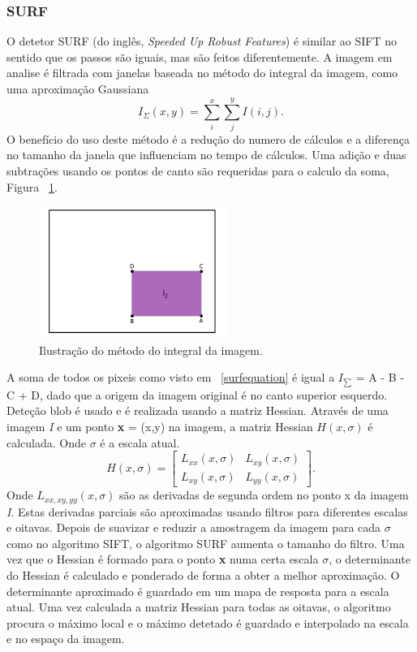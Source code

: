\subsubsection{SURF}

O detetor SURF (do inglês, \textit{Speeded Up Robust Features}) é similar ao SIFT no sentido que os passos são iguais, mas são feitos diferentemente. A imagem em analise é filtrada com janelas baseada no método do integral da imagem, como uma aproximação Gaussiana \begin{equation}\label{surfequation}
I_{\Sigma}(x,y) = \sum_{i}^{x}\sum_{j}^{y}{I(i,j)}. \end{equation}
O benefício do uso deste método é a redução do numero de cálculos e a diferença no tamanho da janela que influenciam no tempo de cálculos. Uma adição e duas subtrações usando os pontos de canto são requeridas para o calculo da soma, Figura ~\ref{fig:surfsqware}.

\begin{figure}[h!]
	\centering
	\includegraphics[width=0.4\linewidth]{figures/surfsqware}
	\caption{Ilustração do método do integral da imagem. \cite{VisualOdometryRodasVehicles}}
	\label{fig:surfsqware}
\end{figure}

A soma de todos os pixeis como visto em ~\ref{surfequation} é igual a \textit{$I_{\sum}$} = A - B - C + D, dado que a origem da imagem original é no canto superior esquerdo. Deteção blob é usado e é realizada usando a matriz Hessian. Através de uma imagem \textit{I} e um ponto \textbf{x} = (x,y) na imagem, a matriz Hessian $\textit{H}(x,\sigma)$ é calculada. Onde $\sigma$ é a escala atual. \[  \textit{H}(x,\sigma) = \left[ \begin{array}{cc}
L_{xx}(x,\sigma) & L_{xy}(x,\sigma) \\ 
L_{xy}(x,\sigma) & L_{yy}(x,\sigma)
\end{array} \right]. \] 
Onde $\textit{L}_{xx,xy,yy}(x,\sigma)$  são as derivadas de segunda ordem no ponto x da imagem \textit{I}. Estas derivadas parciais são aproximadas usando filtros para diferentes escalas e oitavas. Depois de suavizar e reduzir a amostragem da imagem para cada $\sigma$ como no algoritmo SIFT, o algoritmo SURF aumenta o tamanho do filtro. Uma vez que o Hessian é formado para o ponto \textbf{x} numa certa escala $\sigma$, o determinante do Hessian é calculado e ponderado de forma a obter a melhor aproximação.  O determinante aproximado é guardado em um mapa de resposta para a escala atual.
Uma vez calculada a matriz Hessian para todas as oitavas, o algoritmo procura o máximo local e o máximo detetado é guardado e interpolado na escala e no espaço da imagem. 

